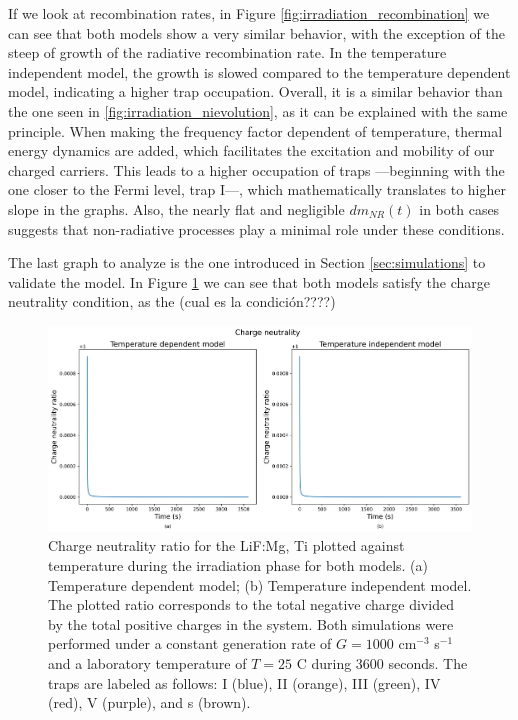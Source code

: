 If we look at recombination rates, in Figure \ref{fig:irradiation_recombination} we can see that both models show a very similar behavior, with the exception of the steep of growth of the radiative recombination rate. In the temperature independent model, the growth is slowed compared to the temperature dependent model, indicating a higher trap occupation. Overall, it is a similar behavior than the one seen in \ref{fig:irradiation_nievolution}, as it can be explained with the same principle. When making the frequency factor dependent of temperature, thermal energy dynamics are added, which facilitates the excitation and mobility of our charged carriers. This leads to a higher occupation of traps ---beginning with the one closer to the Fermi level, trap I---, which mathematically translates to higher slope in the graphs. 
Also, the nearly flat and negligible $dm_{NR}(t)$ in both cases suggests that non-radiative processes play a minimal role under these conditions. %

\vspace{10pt}

The last graph to analyze is the one introduced in Section \ref{sec:simulations} to validate the model. In Figure \ref{fig:irradiation_chneutrality} we can see that both models satisfy the charge neutrality condition, as the (cual es la condición????)

\begin{figure}[ht]
    \centering
    \includegraphics[width=\textwidth]{Images/Irradiation Charge neutrality.png}
    \caption{Charge neutrality ratio for the LiF:Mg, Ti plotted against temperature during the irradiation phase for both models. (a) Temperature dependent model; (b) Temperature independent model. The plotted ratio corresponds to the total negative charge divided by the total positive charges in the system. Both simulations were performed under a constant generation rate of $G = 1000$ cm$^{-3}$ s$^{-1}$ and a laboratory temperature of $T = 25$ \textdegree C during 3600 seconds. The traps are labeled as follows: I (blue), II (orange), III (green), IV (red), V (purple), and s (brown).}
    \label{fig:irradiation_chneutrality}
\end{figure}

